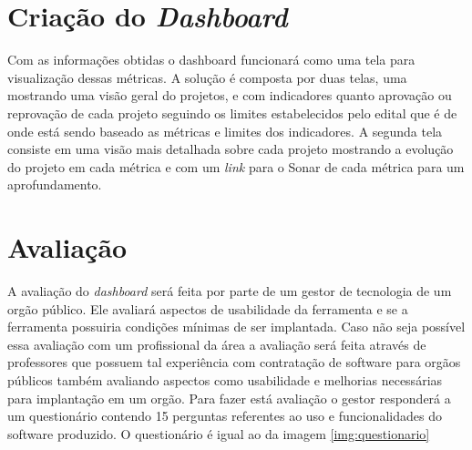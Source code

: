 \section{Criação do \textit{Dashboard}}
Com as informações obtidas o dashboard funcionará como uma tela para visualização dessas métricas. A solução é composta por duas telas, uma mostrando uma visão geral do projetos, e com indicadores quanto aprovação ou reprovação de cada projeto seguindo os limites estabelecidos pelo edital \cite{edital} que é de onde está sendo baseado as métricas e limites dos indicadores. A segunda tela consiste em uma visão mais detalhada sobre cada projeto mostrando a evolução do projeto em cada métrica e com um \textit{link} para o Sonar de cada métrica para um aprofundamento.

\section{Avaliação}
A avaliação do \textit{dashboard} será feita por parte de um gestor de tecnologia de um orgão público. Ele avaliará aspectos de usabilidade da ferramenta e se a ferramenta possuiria condições mínimas de ser implantada. Caso não seja possível essa avaliação com um profissional da área a avaliação será feita através de professores que possuem tal experiência com contratação de software para orgãos públicos também avaliando aspectos como usabilidade e melhorias necessárias para implantação em um orgão.
Para fazer está avaliação o gestor responderá a um questionário contendo 15 perguntas referentes ao uso e funcionalidades do software produzido. O questionário é igual ao da imagem \ref{img:questionario}

